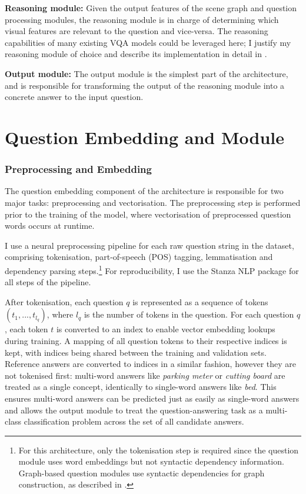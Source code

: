 \textbf{Reasoning module:} Given the output features of the scene graph and question processing modules, the reasoning module is in charge of determining which visual features are relevant to the question and vice-versa. The reasoning capabilities of many existing VQA models could be leveraged here; I justify my reasoning module of choice and describe its implementation in detail in \sectionautorefname{ \ref{section:reasoning_module}}.

\textbf{Output module:} The output module is the simplest part of the architecture, and is responsible for transforming the output of the reasoning module into a concrete answer to the input question.

\section{Question Embedding and Module}
\label{section:question_embedding_and_module}

\subsubsection{Preprocessing and Embedding}

The question embedding component of the architecture is responsible for two major tasks: preprocessing and vectorisation. The preprocessing step is performed prior to the training of the model, where vectorisation of preprocessed question words occurs at runtime. 

I use a neural preprocessing pipeline for each raw question string in the dataset, comprising tokenisation, part-of-speech (POS) tagging, lemmatisation and dependency parsing steps.\footnote{For this architecture, only the tokenisation step is required since the question module uses word embeddings but not syntactic dependency information. Graph-based question modules use syntactic dependencies for graph construction, as described in \subsectionautorefname{ \ref{subsec:question_module_ablations}}.} For reproducibility, I use the Stanza NLP package \cite{qi2020stanza} for all steps of the pipeline.

After tokenisation, each question \(q\) is represented as a sequence of tokens \((t_1, ..., t_{l_q})\), where \(l_q\) is the number of tokens in the question. For each question \(q\), each  token \(t\) is converted to an index to enable vector embedding lookups during training. A mapping of all question tokens to their respective indices is kept, with indices being shared between the training and validation sets. Reference answers are converted to indices in a similar fashion, however they are not tokenised first: multi-word answers like \textit{parking meter} or \textit{cutting board} are treated as a single concept, identically to single-word answers like \textit{bed}. This ensures  multi-word answers can be predicted just as easily as single-word answers and allows the output module to treat the question-answering task as a multi-class classification problem across the set of all candidate answers.

